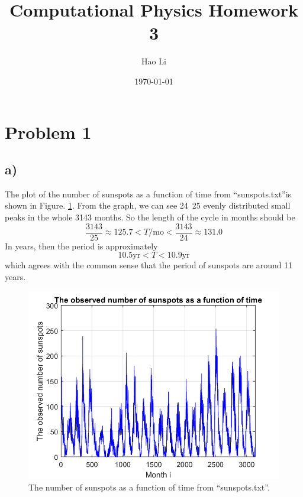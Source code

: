 \documentclass[12pt, graphicx]{article}
\begin{document}
\title{Computational Physics Homework 3}
\author{Hao Li\footnotemark[2]}
\date{\today}


\maketitle

\section*{Problem 1}
\subsection*{a)}
The plot of the number of sunspots as a function of time from \textquotedblleft sunspots.txt\textquotedblright is shown in Figure. \ref{fig:sunspots}. From the graph, we can see 24~25 evenly distributed small peaks in the whole 3143 months. So the length of the cycle in months should be 
\begin{equation}
\frac{3143}{25}\approx125.7<T/\mathrm{mo}<\frac{3143}{24}\approx131.0
\end{equation}
In years, then the period is approximately 
\begin{equation}
10.5\mathrm{yr}<T<10.9\mathrm{yr}
\end{equation}
which agrees with the common sense that the period of sunspots are around 11 years. 

\begin{figure}[ht]
\centering
\includegraphics[width = 120mm]{sunspots.png}
\caption{The number of sunspots as a function of time from \textquotedblleft sunspots.txt\textquotedblright. }
\label{fig:sunspots}
\end{figure}
\end{document}
